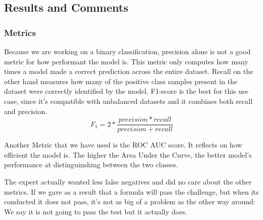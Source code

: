 \documentclass[a4paper,12pt,twoside]{report}
\begin{document}
\subsection{Results and Comments}
\subsubsection{Metrics}
Because we are working on a binary classification, precision alone is not a good metric for how performant the model is. This metric only computes how many times a model made a correct prediction across the entire dataset. Recall on the other hand measures how many of the positive class samples present in the dataset were correctly identified by the model.
F1-score is the best for this use case, since it's compatible with unbalanced datasets and it combines both recall and precision. 
$$ F_1 = 2 * \frac{precision * recall }{precision + recall} $$

Another Metric that we have used is the ROC AUC score. It reflects on how efficient the model is. The higher the Area Under the Curve, the better model's performance at distinguinshing between the two classes.

The expert actually wanted less false negatives and did no care about the other metrics. If we gave as a result that a formula will pass the challenge, but when its conducted it does not pass, it's not as big of a problem as the other way around: We say it is not going to pass the test but it actually does.
\end{document}
